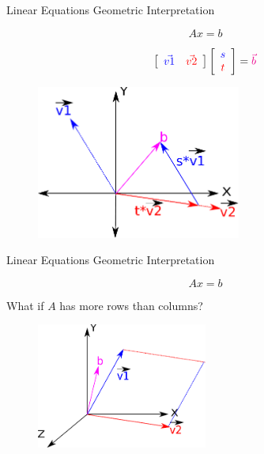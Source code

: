 \documentclass{beamer}
\begin{document}
\begin{frame}{Linear Equations Geometric Interpretation}

\[Ax = b \]

\[ \left[ \begin{array}{cc} \textcolor{blue}{\vec{v1}} & \textcolor{red}{\vec{v2}} \end{array} \right] \left[ \begin{array}{c} \textcolor{blue}{s} \\ \textcolor{red}{t} \end{array} \right] = \textcolor{magenta}{\vec{b}} \]

\begin{figure}[t]
	\centering
    \includegraphics[width=0.6\textwidth]{LinearEquationGeometric.pdf}
\end{figure}


\end{frame}

\begin{frame}{Linear Equations Geometric Interpretation}

\[Ax = b \]

What if $A$ has more rows than columns?

\begin{figure}[t]
	\centering
    \includegraphics[width=0.5\textwidth]{LinearEquationGeometricOver.pdf}
\end{figure}


\end{frame}
\end{document}
